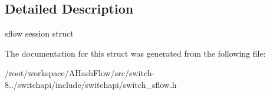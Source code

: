 \subsection{Detailed Description}
sflow session struct 

The documentation for this struct was generated from the following file\+:\begin{DoxyCompactItemize}
\item 
/root/workspace/\+A\+Hash\+Flow/src/switch-\/8../switchapi/include/switchapi/switch\+\_\+sflow.\+h\end{DoxyCompactItemize}
